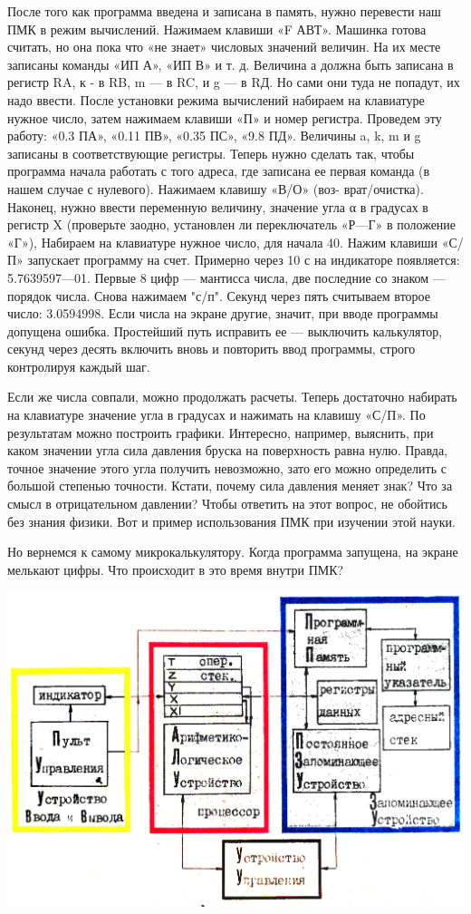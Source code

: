 \documentclass[11pt,a4paper,oneside]{article}
\begin{document}
После того как программа введена и записана в память, нужно перевес­ти наш ПМК в режим вычислений. Нажимаем клавиши «F АВТ». Ма­шинка готова считать, но она пока что «не знает» числовых значений величин. На их месте записаны команды «ИП А», «ИП В» и т. д. Величина а должна быть записана в регистр RA, к - в RB, m — в RC, и g — в RД. Но сами они туда не попадут, их надо ввести. После ус­тановки режима вычислений набира­ем на клавиатуре нужное число, за­тем нажимаем клавиши «П» и номер регистра. Проведем эту работу: «0.3 ПА», «0.11 ПВ», «0.35 ПС», «9.8 ПД». Величины a, k, m и g записаны в соответствующие реги­стры. Теперь нужно сделать так, что­бы программа начала работать с то­го адреса, где записана ее первая команда (в нашем случае с нулево­го). Нажимаем клавишу «В/О» (воз- врат/очистка). Наконец, нужно вве­сти переменную величину, значение угла α в градусах в регистр X (проверьте заодно, установлен ли переключатель «Р—Г» в положение «Г»), Набираем на клавиатуре нуж­ное число, для начала 40. Нажим клавиши «С/П» запускает программу на счет. Примерно через 10 с на ин­дикаторе появляется: 5.7639597—01. Первые 8 цифр — мантисса числа, две последние со знаком — порядок
числа. Снова нажимаем "с/п". Секунд через пять считываем второе число: 3.0594998. Если числа на экране другие, значит, при вводе про­граммы допущена ошибка. Простей­ший путь исправить ее — выклю­чить калькулятор, секунд через де­сять включить вновь и повторить ввод программы, строго контролируя каждый шаг.

Если же числа совпали, можно продолжать расчеты. Теперь доста­точно набирать на клавиатуре значе­ние угла в градусах и нажимать на клавишу «С/П». По результатам мож­но построить графики. Интересно, на­пример, выяснить, при каком значе­нии угла сила давления бруска на поверхность равна нулю. Правда, точное значение этого угла получить невозможно, зато его можно опреде­лить с большой степенью точности. Кстати, почему сила давления меня­ет знак? Что за смысл в отрица­тельном давлении? Чтобы ответить на этот вопрос, не обойтись без зна­ния физики. Вот и пример исполь­зования ПМК при изучении этой на­уки.

Но вернемся к самому микрокаль­кулятору. Когда программа запуще­на, на экране мелькают цифры. Что происходит в это время внутри ПМК?

\includegraphics[width=\textwidth]{princip_scheme}
\end{document}
